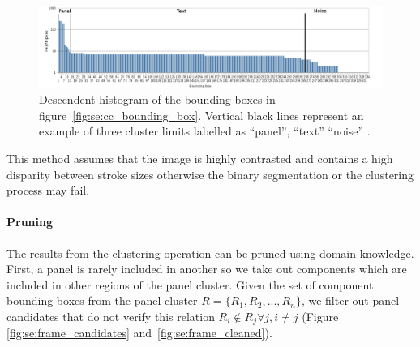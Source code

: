 	\begin{figure}[!ht]	%
	  \centering
		\includegraphics[trim= 5mm 0mm 10mm 0mm, clip,width=1.0\textwidth]{Histogram_en.png}
		\caption[Descendant histogram of the connected component bounding box heights]{Descendent histogram of the bounding boxes in figure~\ref{fig:se:cc_bounding_box}. Vertical black lines represent an example of three cluster limits labelled as ``panel'', ``text'' ``noise'' .}
		\label{fig:se:histo_roi}
	\end{figure}

This method assumes that the image is highly contrasted and contains a high disparity between stroke sizes otherwise the binary segmentation or the clustering process may fail.

\paragraph{Pruning} %
\label{par:se:pruning}
The results from the clustering operation can be pruned using domain knowledge.
First, a panel is rarely included in another so we take out components which are included in other regions of the panel cluster.  
Given the set of component bounding boxes from the panel cluster $R = \{R_1, R_2, ... , R_n\}$, we filter out panel candidates that do not verify this relation $R_i\notin{R_j} \forall j, i \neq j$ (Figure \ref{fig:se:frame_candidates} and~\ref{fig:se:frame_cleaned}).

